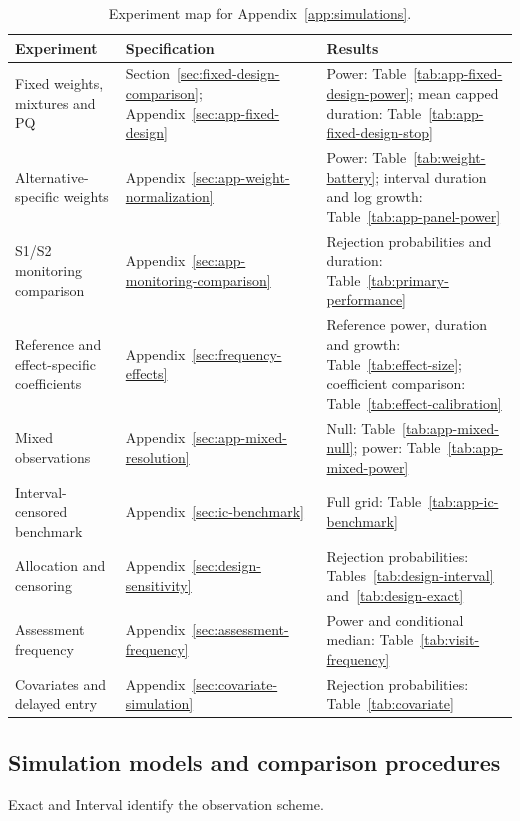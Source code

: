\documentclass[12pt]{article}
\theoremstyle{definition}
\theoremstyle{remark}
\begin{document}
\begin{table}[H]
\centering
\small
\caption*{Experiment map for Appendix~\ref{app:simulations}.}
\begin{tabularx}{\textwidth}{@{}>{\raggedright\arraybackslash}p{}>{\raggedright\arraybackslash}p{}Y@{}}
\toprule
Experiment & Specification & Results \\
\midrule
Fixed weights, mixtures and PQ & Section~\ref{sec:fixed-design-comparison}; Appendix~\ref{sec:app-fixed-design} & Power: Table~\ref{tab:app-fixed-design-power}; mean capped duration: Table~\ref{tab:app-fixed-design-stop} \\
Alternative-specific weights & Appendix~\ref{sec:app-weight-normalization} & Power: Table~\ref{tab:weight-battery}; interval duration and log growth: Table~\ref{tab:app-panel-power} \\
S1/S2 monitoring comparison & Appendix~\ref{sec:app-monitoring-comparison} & Rejection probabilities and duration: Table~\ref{tab:primary-performance} \\
Reference and effect-specific coefficients & Appendix~\ref{sec:frequency-effects} & Reference power, duration and growth: Table~\ref{tab:effect-size}; coefficient comparison: Table~\ref{tab:effect-calibration} \\
Mixed observations & Appendix~\ref{sec:app-mixed-resolution} & Null: Table~\ref{tab:app-mixed-null}; power: Table~\ref{tab:app-mixed-power} \\
Interval-censored benchmark & Appendix~\ref{sec:ic-benchmark} & Full grid: Table~\ref{tab:app-ic-benchmark} \\
Allocation and censoring & Appendix~\ref{sec:design-sensitivity} & Rejection probabilities: Tables~\ref{tab:design-interval} and~\ref{tab:design-exact} \\
Assessment frequency & Appendix~\ref{sec:assessment-frequency} & Power and conditional median: Table~\ref{tab:visit-frequency} \\
Covariates and delayed entry & Appendix~\ref{sec:covariate-simulation} & Rejection probabilities: Table~\ref{tab:covariate} \\
\bottomrule
\end{tabularx}
\end{table}

\subsection{Simulation models and comparison procedures}
\label{sec:app-simulation-designs}
Exact and Interval identify the observation scheme.
\end{document}
